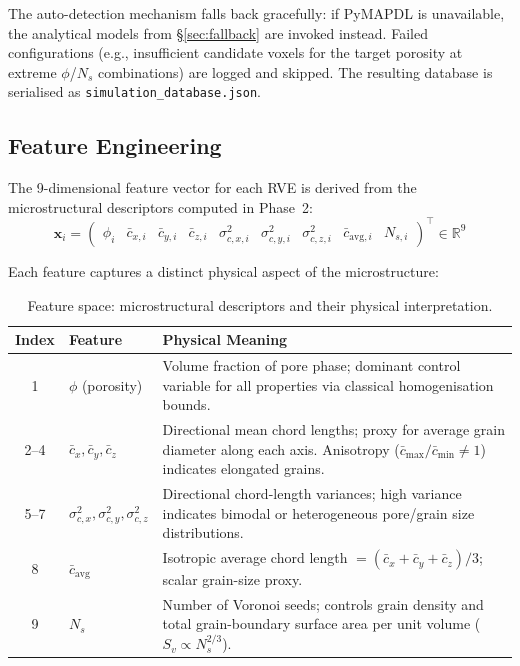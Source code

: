 \documentclass[11pt,a4paper]{article}
\begin{document}
The auto-detection mechanism falls back gracefully: if PyMAPDL is unavailable, the analytical models from \S\ref{sec:fallback} are invoked instead. Failed configurations (e.g., insufficient candidate voxels for the target porosity at extreme $\phi$/$N_s$ combinations) are logged and skipped. The resulting database is serialised as \texttt{simulation\_database.json}.

\subsection{Feature Engineering}
\label{sec:features}

The 9-dimensional feature vector for each RVE is derived from the microstructural descriptors computed in Phase~2:
\begin{equation}
    \mathbf{x}_i = \begin{pmatrix}
        \phi_i & \bar{c}_{x,i} & \bar{c}_{y,i} & \bar{c}_{z,i} & \sigma^2_{c,x,i} & \sigma^2_{c,y,i} & \sigma^2_{c,z,i} & \bar{c}_{\text{avg},i} & N_{s,i}
    \end{pmatrix}^\top \in \mathbb{R}^9
\end{equation}

Each feature captures a distinct physical aspect of the microstructure:

\begin{table}[htbp]
\centering
\caption{Feature space: microstructural descriptors and their physical interpretation.}
\label{tab:features}
\begin{tabular}{@{}clp{6.2cm}@{}}
\toprule
\textbf{Index} & \textbf{Feature} & \textbf{Physical Meaning} \\
\midrule
1 & $\phi$ (porosity) & Volume fraction of pore phase; dominant control variable for all properties via classical homogenisation bounds. \\
2--4 & $\bar{c}_x, \bar{c}_y, \bar{c}_z$ & Directional mean chord lengths; proxy for average grain diameter along each axis. Anisotropy ($\bar{c}_{\max} / \bar{c}_{\min} \neq 1$) indicates elongated grains. \\
5--7 & $\sigma^2_{c,x}, \sigma^2_{c,y}, \sigma^2_{c,z}$ & Directional chord-length variances; high variance indicates bimodal or heterogeneous pore/grain size distributions. \\
8 & $\bar{c}_{\text{avg}}$ & Isotropic average chord length $= (\bar{c}_x + \bar{c}_y + \bar{c}_z)/3$; scalar grain-size proxy. \\
9 & $N_s$ & Number of Voronoi seeds; controls grain density and total grain-boundary surface area per unit volume ($S_v \propto N_s^{2/3}$). \\
\bottomrule
\end{tabular}
\end{table}
\end{document}
